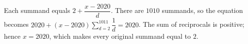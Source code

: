Each summand equals $2+\dfrac{x-2020}{d}$. There are $1010$ summands, so the equation becomes $2020+(x-2020)\sum_{d=2}^{1011}\dfrac{1}{d}=2020$. The sum of reciprocals is positive; hence $\boxed{x=2020}$, which makes every original summand equal to $2$.
